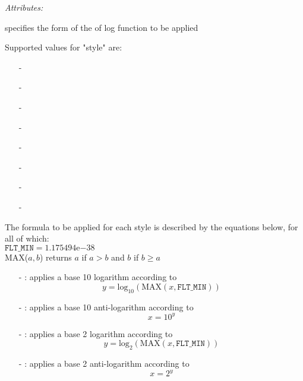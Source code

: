 \emph{Attributes:}
\begin{xmlfields}
	\xmlitem[style][required] specifies the form of the of log function to be applied \par
	Supported values for "style" are: 
        \begin{itemize}
            \item[-] 
            \item[-] 
            \item[-] 
            \item[-] 
            \item[-] 
            \item[-] 
            \item[-] 
            \item[-] 
        \end{itemize}
            
	The formula to be applied for each style is described by the equations below, for all of which: \\[6pt]
        \tabto{0.75in} $\texttt{FLT\_MIN} = 1.175494\mathrm{e}{-38}$\\[6pt]
        \tabto{0.75in} MAX(${a,b}$) returns $a$ if $a > b$ and $b$ if $b \geq a$

	    \begin{itemize}
            \item[-] : applies a base 10 logarithm according to
            	\begin{equation}
					y = \text{log}_{10}(\mathrm{MAX}(x,\texttt{FLT\_MIN}))
				\end{equation}
				
            \item[-] : applies a base 10 anti-logarithm according to
				\begin{equation}
					x = 10^{y}
				\end{equation}
				
            \item[-] : applies a base 2 logarithm according to
				\begin{equation}
					y = \text{log}_{2}(\mathrm{MAX}(x,\texttt{FLT\_MIN}))
				\end{equation}
				
            \item[-] : applies a base 2 anti-logarithm according to
				\begin{equation}
					x = 2^{y}
				\end{equation}
            

\end{itemize}
\end{xmlfields}

